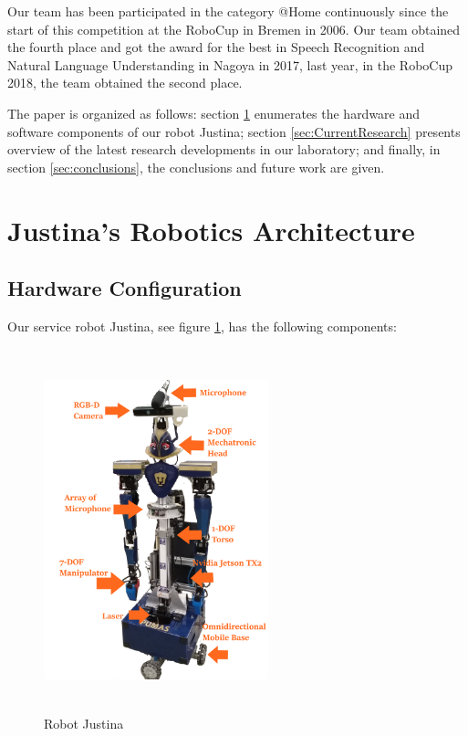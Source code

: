 \documentclass{llncs}
\begin{document}
Our team has been participated in the category @Home continuously since the start of this competition at the RoboCup in Bremen in 2006. Our team obtained the  fourth place and got the award for the best in Speech Recognition and Natural Language Understanding in Nagoya in 2017, last year, in the RoboCup 2018, the team obtained the second place.

The paper is organized as follows:
section \ref{sec:background} enumerates the hardware and software components of our robot
Justina; section \ref{sec:CurrentResearch}  presents overview of the latest research developments in our
laboratory; and finally, in section \ref{sec:conclusions}, the conclusions and future work are given.


\section{Justina's Robotics Architecture}\label{sec:background}
\subsection{Hardware Configuration}

Our service robot Justina, see figure \ref{fig:justina}, has the following components:\\

\begin{figure}
	\includegraphics[angle=0, height=10.5cm, width=6.5cm]{Figures/justinaEsquema.png}
  \caption{Robot Justina}
  \label{fig:justina}
\end{figure}
\end{document}
